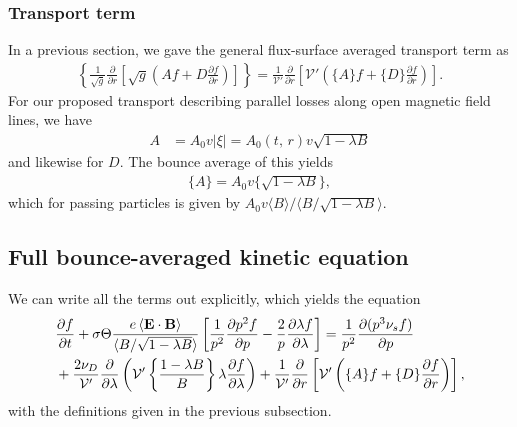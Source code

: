 \documentclass[11pt,a4paper]{article}
\renewcommand{\b}[1]{\ensuremath{ {\bf #1 } }}
\begin{document}
\subsubsection*{Transport term}
In a previous section, we gave the general flux-surface averaged transport term as
\begin{align}
\left\{\frac{1}{\sqrt{g}}\frac{\partial}{\partial r}\left[ \sqrt{g}\left( Af+D\frac{\partial f}{\partial r}\right)\right]\right\} = \frac{1}{\mathcal{V}'}\frac{\partial}{\partial r}\left[ \mathcal{V'}\left(\{A\}f+ \{D\}\frac{\partial f}{\partial r} \right) \right].
\end{align}
For our proposed transport describing parallel losses along open magnetic field lines, we have
\begin{align}
A &= A_0 v |\xi| = A_0(t,\,r) v \sqrt{1-\lambda B}
\end{align}
and likewise for $D$. The bounce average of this yields
\begin{align}
\{A\} = A_0 v \{\sqrt{1-\lambda B}\},
\end{align}
which for passing particles is given by  $A_0 v \langle B \rangle/\langle B/\sqrt{1-\lambda B}\rangle$.


\subsection{Full bounce-averaged kinetic equation}
We can write all the terms out explicitly, which yields the equation
\begin{align}
\frac{\partial f}{\partial t} &+ \sigma \Theta \frac{e \left\langle \b{E}\cdot\b{B}\right\rangle}{\langle B/\sqrt{1-\lambda B} \rangle}\left[\frac{1}{p^2}\frac{\partial p^2 f}{\partial p}  - \frac{2}{p}\frac{\partial \lambda f}{\partial \lambda}\right]  = \frac{1}{p^2}\frac{\partial(p^3 \nu_s f)}{\partial p} \nonumber \\
&\hspace{-5mm}+ \frac{2\nu_D}{\mathcal{V}'}\frac{\partial}{\partial \lambda}\left(  \mathcal{V'}\left\{\frac{1-\lambda B}{B}\right\} \lambda\frac{\partial f}{\partial \lambda}\right)+\frac{1}{\mathcal{V}'}\frac{\partial}{\partial r}\left[ \mathcal{V'}\left(\{A\}f+ \{D\}\frac{\partial f}{\partial r} \right) \right],
\label{eq:full bounce averaged}
\end{align}
with the definitions given in the previous subsection.
\end{document}
